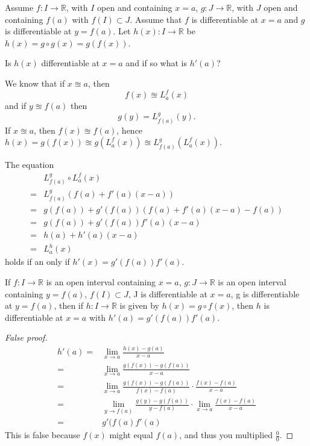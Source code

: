 
Assume $f\colon I\to \mathbb{R}$, with $I$ open and containing $x=a$, $g\colon J\to \mathbb{R}$, with $J$ open and containing $f(a)$ with $f(I)\subset J$. Assume that $f$ is differentiable at $x=a$ and $g$ is differentiable at $y=f(a)$. Let $h(x) \colon I\to \mathbb{R}$ be $h(x) = g\circ g(x) = g(f(x))$.

\begin{ques}
Is $h(x)$ differentiable at $x=a$ and if so what is $h'(a)$? 
\end{ques}

We know that if $x\approxeq a$, then \[f(x)\approxeq L_a^f (x)\] and if $y\approxeq f(a)$ then \[g(y) = L_{f(a)}^{g} (y).\] If $x\approxeq a$, then $f(x)\approxeq f(a)$, hence $h(x)=g(f(x)) \approxeq g(L_{a}^f (x)) \approxeq L_{f(a)}^g (L_a^f (x))$.

The equation
\begin{align*}
    &L_{f(a)}^g \circ L_a^f (x) \\
    = & L_{f(a)}^g (f(a) + f'(a)(x-a))\\
    =& g(f(a)) + g'(f(a))(f(a) + f'(a)(x-a) - f(a))\\
    = & g(f(a)) + g'(f(a))f'(a)(x-a)\\
    = & h(a) + h'(a)(x-a)\\
    = & L_a^h (x)
\end{align*}
holds if an only if $h'(x) = g'(f(a))f'(a)$.

\begin{thm}
    If $f\colon I\to \mathbb{R}$ is an open interval containing $x=a$, $g\colon J \to \mathbb{R}$ is an open interval containing $y= f(a)$, $f(I) \subset J$, J is differentiable at $x= a$, g is differentiable at $y =f(a)$, then if $h \colon I\to \mathbb{R}$ is given by $ h(x)=g\circ f(x)$, then $h$ is differentiable at $x=a$ with $h'(a) = g'(f(a))f'(a)$.
\end{thm}

\begin{proof}[False proof]
    \begin{align*}
    h'(a) = & \lim_{x\to a} \frac{h(x) - g(a)}{x-a} \\
    = & \lim_{x\to a } \frac{g(f(x)) - g(f(a))}{ x-a} \\
    = & \lim_{x\to a} \frac{g(f(x)) - g(f(a))}{f(x) - f(a)}\cdot \frac{f(x) - f(a)}{x-a} \\
    =& \lim_{y\to f(a)} \frac{g(y) - g(f(a))}{y-f(a)} \cdot \lim_{x\to a}\frac{f(x) - f(a)}{x-a}\\
    = & g'(f(a)f'(a)
    \end{align*}
    This is false because $f(x)$ might equal $f(a)$, and thus you multiplied $\frac{0}{0}$.
\end{proof}

